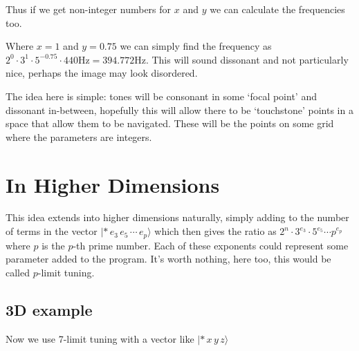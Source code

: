 Thus if we get non-integer numbers for $x$ and $y$ we can calculate the frequencies too.
\begin{center}
\end{center}

Where $x=1$ and $y=0.75$ we can simply find the frequency as $2^0 \cdot 3^1 \cdot 5^{-0.75} \cdot
440\si{\hertz} = 394.772\si{\hertz}$. This will sound dissonant and not particularly nice, perhaps
the image may look disordered.

The idea here is simple: tones will be consonant in some `focal point' and dissonant in-between,
hopefully this will allow there to be `touchstone' points in a space that allow them to be
navigated. These will be the points on some grid where the parameters are integers.

\section{In Higher Dimensions}
This idea extends into higher dimensions naturally, simply adding to the number of terms in the
vector $|*\, e_3\, e_5\, \cdots\, e_p \rangle$ which then gives the ratio as $2^n \cdot 3^{e_3}
\cdot 5^{e_5} \cdots p^{e_p}$ where $p$ is the $p$-th prime number. Each of these exponents could
represent some parameter added to the program. It's worth nothing, here too, this would be called
$p$-limit tuning.

\subsection{3D example}
Now we use 7-limit tuning with a vector like $| *\, x\, y\, z\rangle$

\begin{center}
\end{center}

